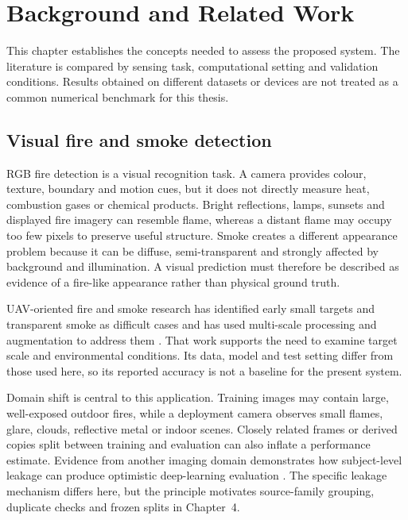 \chapter{Background and Related Work}
\label{ch:background}

This chapter establishes the concepts needed to assess the proposed system.
The literature is compared by sensing task, computational setting and
validation conditions. Results obtained on different datasets or devices are
not treated as a common numerical benchmark for this thesis.

\section{Visual fire and smoke detection}
\label{sec:background:vision}

RGB fire detection is a visual recognition task. A camera provides colour,
texture, boundary and motion cues, but it does not directly measure heat,
combustion gases or chemical products. Bright reflections, lamps, sunsets and
displayed fire imagery can resemble flame, whereas a distant flame may occupy
too few pixels to preserve useful structure. Smoke creates a different
appearance problem because it can be diffuse, semi-transparent and strongly
affected by background and illumination. A visual prediction must therefore
be described as evidence of a fire-like appearance rather than physical ground
truth.

UAV-oriented fire and smoke research has identified early small targets and
transparent smoke as difficult cases and has used multi-scale processing and
augmentation to address them \cite{Fan2025UAVFire}. That work supports the
need to examine target scale and environmental conditions. Its data, model and
test setting differ from those used here, so its reported accuracy is not a
baseline for the present system.

Domain shift is central to this application. Training images may contain large,
well-exposed outdoor fires, while a deployment camera observes small flames,
glare, clouds, reflective metal or indoor scenes. Closely related frames or
derived copies split between training and evaluation can also inflate a
performance estimate. Evidence from another imaging domain demonstrates how
subject-level leakage can produce optimistic deep-learning evaluation
\cite{Tampu2022Leakage}. The specific leakage mechanism differs here, but the
principle motivates source-family grouping, duplicate checks and frozen splits
in Chapter~4.

